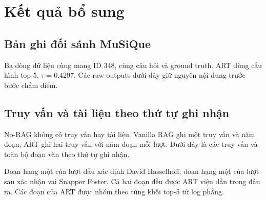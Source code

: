 \chapter{Kết quả bổ sung}
\label{app:examples}
\section{Bản ghi đối sánh MuSiQue}
Ba dòng dữ liệu cùng mang ID 348, cùng câu hỏi và ground truth. ART dùng cấu hình top-5, \(\tau=0.4297\). Các raw outputs dưới đây giữ nguyên nội dung trước bước chấm điểm.

\begin{quote}\SingleSpacing

\end{quote}

\section{Truy vấn và tài liệu theo thứ tự ghi nhận}
No-RAG không có truy vấn hay tài liệu. Vanilla RAG ghi một truy vấn và năm đoạn; ART ghi hai truy vấn với năm đoạn mỗi lượt. Dưới đây là các truy vấn và toàn bộ đoạn văn theo thứ tự ghi nhận.

\begin{quote}\SingleSpacing

\end{quote}

Đoạn hạng một của lượt đầu xác định David Hasselhoff; đoạn hạng một của lượt sau xác nhận vai Snapper Foster. Cả hai đoạn đều được ART viện dẫn trong đầu ra. Các đoạn của ART được nhóm theo từng khối top-5 từ log phẳng.

